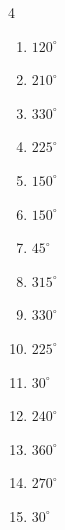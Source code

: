 \begin{multicols}{4}
\begin{enumerate}
  \item $\displaystyle 120^{\circ}$

  \item $\displaystyle 210^{\circ}$

  \item $\displaystyle 330^{\circ}$

  \item $\displaystyle 225^{\circ}$

  \item $\displaystyle 150^{\circ}$

  \item $\displaystyle 150^{\circ}$

  \item $\displaystyle 45^{\circ}$

  \item $\displaystyle 315^{\circ}$

  \item $\displaystyle 330^{\circ}$

  \item $\displaystyle 225^{\circ}$

  \item $\displaystyle 30^{\circ}$

\columnbreak %

\resetques

  \item $\displaystyle 240^{\circ}$

  \item $\displaystyle 360^{\circ}$
        \phantom{$\displaystyle =2\pi$}

  \item $\displaystyle 270^{\circ}$

  \item $\displaystyle 30^{\circ}$


\end{enumerate}
\end{multicols}
